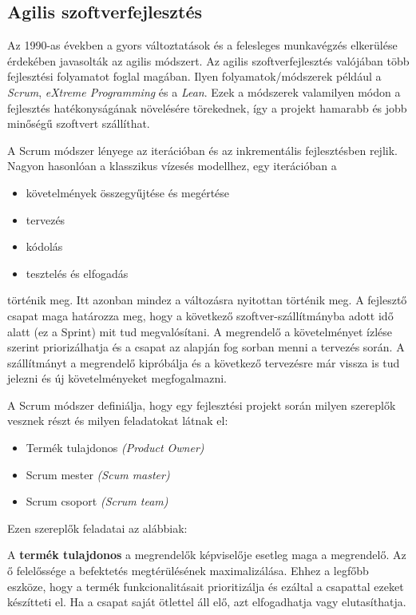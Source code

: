 \documentclass[a4paper,12pt,leqno, notitlepage]{article}%
\begin{document}
\subsection{Agilis szoftver\-fejlesztés}

Az 1990-as években a gyors változtatások és a felesleges munkavégzés elkerülése érdekében javasolták az agilis módszert. Az agilis szoftver\-fejlesztés valójában több fejlesztési folyamatot foglal magában. Ilyen folyamatok/módszerek például a \emph{Scrum}, \emph{eXtreme Programming} és a \emph{Lean}.\cite{agile} Ezek a módszerek valamilyen módon a fejlesztés hatékonyságának növelésére törekednek, így a projekt hamarabb és jobb minőségű szoftvert szállíthat.

A Scrum módszer lényege az iterációban és az inkrementális fejlesztésben rejlik. Nagyon hasonlóan a klasszikus vízesés modellhez, egy iterációban a 
\begin{itemize}
	\item követelmények összegyűjtése és megértése
	\item tervezés
	\item kódolás
	\item tesztelés és elfogadás
\end{itemize}
történik meg. Itt azonban mindez a változásra nyitottan történik meg. A fejlesztő csapat maga határozza meg, hogy a következő szoftver-szállítmányba adott idő alatt (ez a Sprint)  mit tud megvalósítani. A megrendelő a követelményet ízlése szerint priorizálhatja és a csapat az alapján fog sorban menni  a tervezés során. A szállítmányt a megrendelő kipróbálja és a következő tervezésre már vissza is tud jelezni és új követelményeket megfogalmazni.

A Scrum módszer definiálja, hogy egy fejlesztési projekt során milyen szereplők vesznek részt és milyen feladatokat látnak el:

\begin{itemize}
	\item Termék tulajdonos \emph{(Product Owner)}
	\item Scrum mester \emph{(Scum master)}
	\item Scrum csoport \emph{(Scrum team)}
\end{itemize}

Ezen szereplők feladatai az alábbiak:

A \textbf{termék tulajdonos} a megrendelők képviselője esetleg maga a megrendelő. Az ő felelőssége a befektetés megtérülésének maximalizálása. Ehhez a legfőbb eszköze, hogy a termék funkcionalitásait prioritizálja és ezáltal a csapattal ezeket készítteti el. Ha a csapat saját ötlettel áll elő, azt elfogadhatja vagy elutasíthatja. \cite{scrum_roles}
\end{document}
